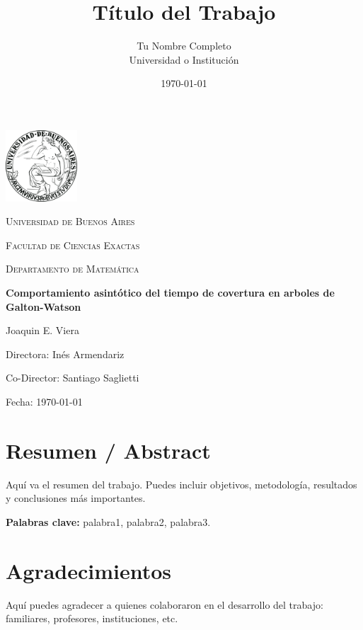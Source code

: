 \documentclass[12pt]{report}
\title{Título del Trabajo}
\author{Tu Nombre Completo\\ \small{Universidad o Institución}}
\date{\today}
\begin{document}
\begin{titlepage}
    \centering
    \includegraphics[width=0.2\textwidth]{imagenes/logo_UBA.png}\par\vspace{1cm} %
    {\scshape\LARGE Universidad de Buenos Aires \par}
    \vspace{1cm}
    {\scshape\Large Facultad de Ciencias Exactas \par}
    {\scshape\Large Departamento de Matemática \par}
    \vspace{1.5cm}
    {\huge\bfseries Comportamiento asintótico del tiempo de covertura en arboles de Galton-Watson\par}

    \vspace{2cm}
    {\Large Joaquin E. Viera\par}
    \vspace{0.5cm}
    {\Large Directora: Inés Armendariz \par}
    {\Large Co-Director: Santiago Saglietti \par}

    \vfill
    {\large Fecha: \today\par}
\end{titlepage}

\chapter*{Resumen / Abstract}
Aquí va el resumen del trabajo. Puedes incluir objetivos, metodología, resultados y conclusiones más importantes.

\vspace{1cm}
\textbf{Palabras clave:} palabra1, palabra2, palabra3.

\chapter*{Agradecimientos}
Aquí puedes agradecer a quienes colaboraron en el desarrollo del trabajo: familiares, profesores, instituciones, etc.
\end{document}
